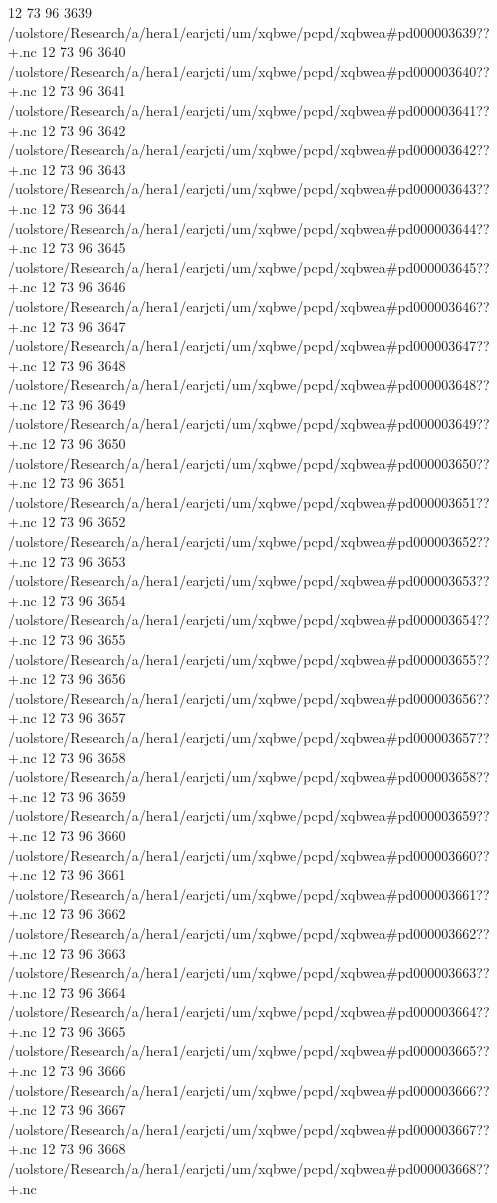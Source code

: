 12 73 96
3639
/uolstore/Research/a/hera1/earjcti/um/xqbwe/pcpd/xqbwea#pd000003639??+.nc
12 73 96
3640
/uolstore/Research/a/hera1/earjcti/um/xqbwe/pcpd/xqbwea#pd000003640??+.nc
12 73 96
3641
/uolstore/Research/a/hera1/earjcti/um/xqbwe/pcpd/xqbwea#pd000003641??+.nc
12 73 96
3642
/uolstore/Research/a/hera1/earjcti/um/xqbwe/pcpd/xqbwea#pd000003642??+.nc
12 73 96
3643
/uolstore/Research/a/hera1/earjcti/um/xqbwe/pcpd/xqbwea#pd000003643??+.nc
12 73 96
3644
/uolstore/Research/a/hera1/earjcti/um/xqbwe/pcpd/xqbwea#pd000003644??+.nc
12 73 96
3645
/uolstore/Research/a/hera1/earjcti/um/xqbwe/pcpd/xqbwea#pd000003645??+.nc
12 73 96
3646
/uolstore/Research/a/hera1/earjcti/um/xqbwe/pcpd/xqbwea#pd000003646??+.nc
12 73 96
3647
/uolstore/Research/a/hera1/earjcti/um/xqbwe/pcpd/xqbwea#pd000003647??+.nc
12 73 96
3648
/uolstore/Research/a/hera1/earjcti/um/xqbwe/pcpd/xqbwea#pd000003648??+.nc
12 73 96
3649
/uolstore/Research/a/hera1/earjcti/um/xqbwe/pcpd/xqbwea#pd000003649??+.nc
12 73 96
3650
/uolstore/Research/a/hera1/earjcti/um/xqbwe/pcpd/xqbwea#pd000003650??+.nc
12 73 96
3651
/uolstore/Research/a/hera1/earjcti/um/xqbwe/pcpd/xqbwea#pd000003651??+.nc
12 73 96
3652
/uolstore/Research/a/hera1/earjcti/um/xqbwe/pcpd/xqbwea#pd000003652??+.nc
12 73 96
3653
/uolstore/Research/a/hera1/earjcti/um/xqbwe/pcpd/xqbwea#pd000003653??+.nc
12 73 96
3654
/uolstore/Research/a/hera1/earjcti/um/xqbwe/pcpd/xqbwea#pd000003654??+.nc
12 73 96
3655
/uolstore/Research/a/hera1/earjcti/um/xqbwe/pcpd/xqbwea#pd000003655??+.nc
12 73 96
3656
/uolstore/Research/a/hera1/earjcti/um/xqbwe/pcpd/xqbwea#pd000003656??+.nc
12 73 96
3657
/uolstore/Research/a/hera1/earjcti/um/xqbwe/pcpd/xqbwea#pd000003657??+.nc
12 73 96
3658
/uolstore/Research/a/hera1/earjcti/um/xqbwe/pcpd/xqbwea#pd000003658??+.nc
12 73 96
3659
/uolstore/Research/a/hera1/earjcti/um/xqbwe/pcpd/xqbwea#pd000003659??+.nc
12 73 96
3660
/uolstore/Research/a/hera1/earjcti/um/xqbwe/pcpd/xqbwea#pd000003660??+.nc
12 73 96
3661
/uolstore/Research/a/hera1/earjcti/um/xqbwe/pcpd/xqbwea#pd000003661??+.nc
12 73 96
3662
/uolstore/Research/a/hera1/earjcti/um/xqbwe/pcpd/xqbwea#pd000003662??+.nc
12 73 96
3663
/uolstore/Research/a/hera1/earjcti/um/xqbwe/pcpd/xqbwea#pd000003663??+.nc
12 73 96
3664
/uolstore/Research/a/hera1/earjcti/um/xqbwe/pcpd/xqbwea#pd000003664??+.nc
12 73 96
3665
/uolstore/Research/a/hera1/earjcti/um/xqbwe/pcpd/xqbwea#pd000003665??+.nc
12 73 96
3666
/uolstore/Research/a/hera1/earjcti/um/xqbwe/pcpd/xqbwea#pd000003666??+.nc
12 73 96
3667
/uolstore/Research/a/hera1/earjcti/um/xqbwe/pcpd/xqbwea#pd000003667??+.nc
12 73 96
3668
/uolstore/Research/a/hera1/earjcti/um/xqbwe/pcpd/xqbwea#pd000003668??+.nc
